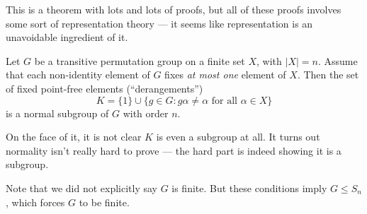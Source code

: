 \documentclass[a4paper]{article}
\begin{document}
This is a theorem with lots and lots of proofs, but all of these proofs involves some sort of representation theory --- it seems like representation is an unavoidable ingredient of it.

\begin{thm}
  Let $G$ be a transitive permutation group on a finite set $X$, with $|X| = n$. Assume that each non-identity element of $G$ fixes \emph{at most one} element of $X$. Then the set of fixed point-free elements (``derangements'')
  \[
    K = \{1\} \cup \{g \in G: g\alpha \not= \alpha\text{ for all }\alpha \in X\}
  \]
  is a normal subgroup of $G$ with order $n$.
\end{thm}
On the face of it, it is not clear $K$ is even a subgroup at all. It turns out normality isn't really hard to prove --- the hard part is indeed showing it is a subgroup.

Note that we did not explicitly say $G$ is finite. But these conditions imply $G \leq S_n$, which forces $G$ to be finite.
\end{document}
